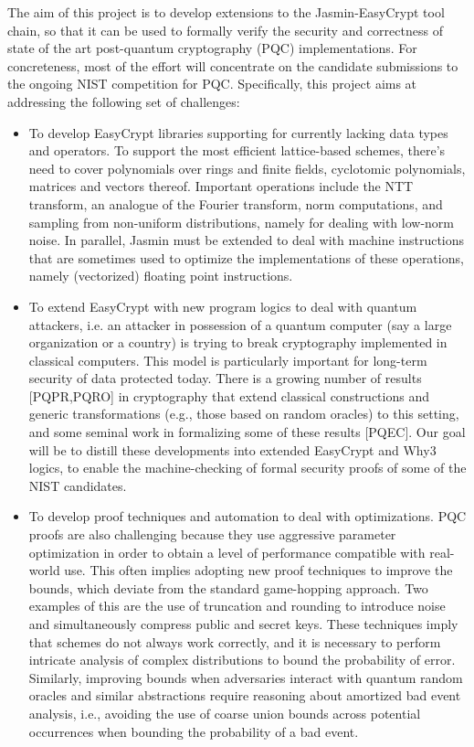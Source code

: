 \documentclass[preprint]{iacrtrans}
\begin{document}
The aim of this project is to develop extensions to the
Jasmin-EasyCrypt tool chain, so that it can be used to formally verify
the security and correctness of state of the art post-quantum
cryptography (PQC) implementations. For concreteness, most of the
effort will concentrate on the candidate submissions to the ongoing
NIST competition for PQC. Specifically, this project aims at
addressing the following set of challenges:
\begin{itemize}
\item To develop EasyCrypt libraries supporting for currently
  lacking data types and operators. To support the most efficient
  lattice-based schemes, there's need to cover polynomials over rings
  and finite fields, cyclotomic polynomials, matrices and vectors
  thereof. Important operations include the NTT transform, an analogue
  of the Fourier transform, norm computations, and sampling from
  non-uniform distributions, namely for dealing with low-norm
  noise. In parallel, Jasmin must be extended to deal with machine
  instructions that are sometimes used to optimize the implementations
  of these operations, namely (vectorized) floating point
  instructions.
\item To extend EasyCrypt with new program logics to deal with quantum
  attackers, i.e. an attacker in possession of a quantum computer (say
  a large organization or a country) is trying to break cryptography
  implemented in classical computers. This model is particularly
  important for long-term security of data protected today. There is a
  growing number of results [PQPR,PQRO] in cryptography that extend
  classical constructions and generic transformations (e.g., those
  based on random oracles) to this setting, and some seminal work in
  formalizing some of these results [PQEC]. Our goal will be to
  distill these developments into extended EasyCrypt and Why3 logics,
  to enable the machine-checking of formal security proofs of some of
  the NIST candidates.
\item To develop proof techniques and automation to deal with
  optimizations. PQC proofs are also challenging because they use
  aggressive parameter optimization in order to obtain a level of
  performance compatible with real-world use. This often implies
  adopting new proof techniques to improve the bounds, which deviate
  from the standard game-hopping approach. Two examples of this are
  the use of truncation and rounding to introduce noise and
  simultaneously compress public and secret keys. These techniques
  imply that schemes do not always work correctly, and it is necessary
  to perform intricate analysis of complex distributions to bound the
  probability of error. Similarly, improving bounds when adversaries
  interact with quantum random oracles and similar abstractions
  require reasoning about amortized bad event analysis, i.e., avoiding
  the use of coarse union bounds across potential occurrences when
  bounding the probability of a bad event.
\end{itemize}
\end{document}

